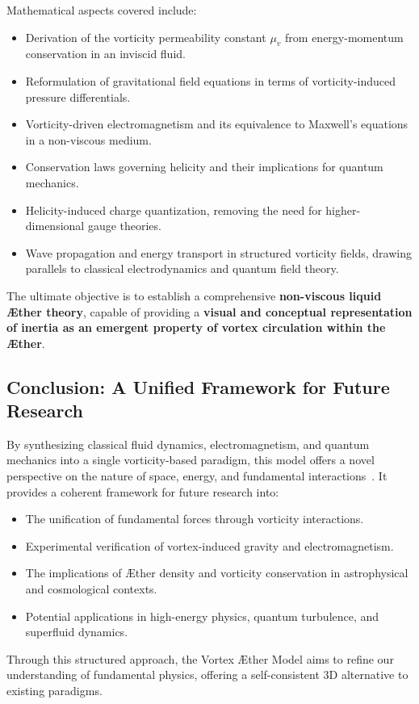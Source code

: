 \documentclass[a4paper,10pt]{article}
\begin{document}
Mathematical aspects covered include:
\begin{itemize}
    \item Derivation of the vorticity permeability constant \( \mu_v \) from energy-momentum conservation in an inviscid fluid.
    \item Reformulation of gravitational field equations in terms of vorticity-induced pressure differentials.
    \item Vorticity-driven electromagnetism and its equivalence to Maxwell's equations in a non-viscous medium.
    \item Conservation laws governing helicity and their implications for quantum mechanics.
    \item Helicity-induced charge quantization, removing the need for higher-dimensional gauge theories.
    \item Wave propagation and energy transport in structured vorticity fields, drawing parallels to classical electrodynamics and quantum field theory.
\end{itemize}
The ultimate objective is to establish a comprehensive \textbf{non-viscous liquid Æther theory}, capable of providing a \textbf{visual and conceptual representation of inertia as an emergent property of vortex circulation within the Æther}.

\subsection*{Conclusion: A Unified Framework for Future Research}
By synthesizing classical fluid dynamics, electromagnetism, and quantum mechanics into a single vorticity-based paradigm, this model offers a novel perspective on the nature of space, energy, and fundamental interactions~\cite{Polchinski1998}. It provides a coherent framework for future research into:
\begin{itemize}
    \item The unification of fundamental forces through vorticity interactions.
    \item Experimental verification of vortex-induced gravity and electromagnetism.
    \item The implications of Æther density and vorticity conservation in astrophysical and cosmological contexts.
    \item Potential applications in high-energy physics, quantum turbulence, and superfluid dynamics.
\end{itemize}

Through this structured approach, the Vortex Æther Model aims to refine our understanding of fundamental physics, offering a self-consistent 3D alternative to existing paradigms.
\end{document}
